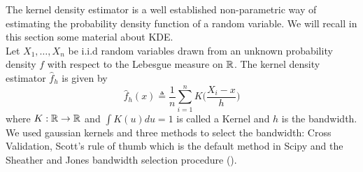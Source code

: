 The kernel density estimator is a well established non-parametric way of estimating the probability density function of a random variable. We will recall in this section some material about KDE.\\
Let $X_1,\dots,X_n$ be i.i.d random variables drawn from an unknown probability density $f$ with respect to the Lebesgue measure on ${\mathbb R}$. The kernel density estimator $\hat f_h $ is given by
\begin{equation}
	\hat f_h(x) \triangleq \frac{1}{n}\sum_{i=1}^nK\Big(\frac{X_i-x}{h}\Big)
\end{equation}
where $K:{\mathbb R} \rightarrow {\mathbb R}$ and $\int K(u)du = 1$ is called a Kernel and $h$ is the bandwidth. We used gaussian kernels and three methods to select the bandwidth: Cross Validation, Scott's rule of thumb which is the default method in Scipy and the Sheather and Jones bandwidth selection procedure (\cite{sheather_bdwth}).

